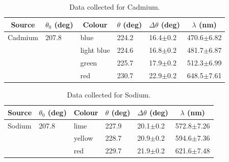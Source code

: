 \begin{enumerate}
\begin{table}[ht]
\center
\begin{tabular}{|l|l|l|l|l|l|}
\hline
\multicolumn{1}{|c|}{Source} & \multicolumn{1}{c|}{$\theta_0$ (deg)} & \multicolumn{1}{c|}{Colour} & \multicolumn{1}{c|}{$\theta$ (deg)} & \multicolumn{1}{c|}{$\Delta\theta$ (deg)} & \multicolumn{1}{c|}{$\lambda$ (nm)} \\ \hline
Cadmium                                  & 207.8                                 & blue                        & 224.2                               & 16.4$\pm$0.2                              & 470.6$\pm$6.82                      \\ \hline
                                         &                                       & light blue                  & 224.6                               & 16.8$\pm$0.2                              & 481.7$\pm$6.87                      \\ \hline
                                         &                                       & green                       & 225.7                               & 17.9$\pm$0.2                              & 512.3$\pm$6.99                      \\ \hline
                                         &                                       & red                         & 230.7                               & 22.9$\pm$0.2                              & 648.5$\pm$7.61                      \\ \hline
\end{tabular}
\caption{Data collected for Cadmium.}
\label{tab:spcg4}
\end{table}


\begin{table}[ht]
\center
\begin{tabular}{|l|l|l|l|l|l|}
\hline
\multicolumn{1}{|c|}{Source} & \multicolumn{1}{c|}{$\theta_0$ (deg)} & \multicolumn{1}{c|}{Colour} & \multicolumn{1}{c|}{$\theta$ (deg)} & \multicolumn{1}{c|}{$\Delta\theta$ (deg)} & \multicolumn{1}{c|}{$\lambda$ (nm)} \\ \hline
Sodium                                   & 207.8                                 & lime                        & 227.9                               & 20.1$\pm$0.2                              & 572.8$\pm$7.26                      \\ \hline
                                         &                                       & yellow                      & 228.7                               & 20.9$\pm$0.2                              & 594.6$\pm$7.36                      \\ \hline
                                         &                                       & red                         & 229.7                               & 21.9$\pm$0.2                              & 621.6$\pm$7.48                      \\ \hline
\end{tabular}
\caption{Data collected for Sodium.}
\label{tab:spcg5}
\end{table}


\end{enumerate}

